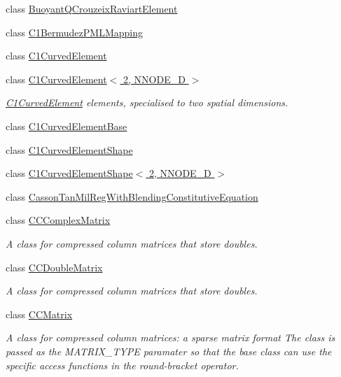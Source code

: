 \begin{DoxyCompactItemize}
class \hyperlink{classoomph_1_1BuoyantQCrouzeixRaviartElement}{Buoyant\+Q\+Crouzeix\+Raviart\+Element}
\item 
class \hyperlink{classoomph_1_1C1BermudezPMLMapping}{C1\+Bermudez\+P\+M\+L\+Mapping}
\item 
class \hyperlink{classoomph_1_1C1CurvedElement}{C1\+Curved\+Element}
\item 
class \hyperlink{classoomph_1_1C1CurvedElement_3_012_00_01NNODE__1D_01_4}{C1\+Curved\+Element$<$ 2, N\+N\+O\+D\+E\+\_\+D $>$}
\begin{DoxyCompactList}\small\item\em \hyperlink{classoomph_1_1C1CurvedElement}{C1\+Curved\+Element} elements, specialised to two spatial dimensions. \end{DoxyCompactList}\item 
class \hyperlink{classoomph_1_1C1CurvedElementBase}{C1\+Curved\+Element\+Base}
\item 
class \hyperlink{classoomph_1_1C1CurvedElementShape}{C1\+Curved\+Element\+Shape}
\item 
class \hyperlink{classoomph_1_1C1CurvedElementShape_3_012_00_01NNODE__1D_01_4}{C1\+Curved\+Element\+Shape$<$ 2, N\+N\+O\+D\+E\+\_\+D $>$}
\item 
class \hyperlink{classoomph_1_1CassonTanMilRegWithBlendingConstitutiveEquation}{Casson\+Tan\+Mil\+Reg\+With\+Blending\+Constitutive\+Equation}
\item 
class \hyperlink{classoomph_1_1CCComplexMatrix}{C\+C\+Complex\+Matrix}
\begin{DoxyCompactList}\small\item\em A class for compressed column matrices that store doubles. \end{DoxyCompactList}\item 
class \hyperlink{classoomph_1_1CCDoubleMatrix}{C\+C\+Double\+Matrix}
\begin{DoxyCompactList}\small\item\em A class for compressed column matrices that store doubles. \end{DoxyCompactList}\item 
class \hyperlink{classoomph_1_1CCMatrix}{C\+C\+Matrix}
\begin{DoxyCompactList}\small\item\em A class for compressed column matrices\+: a sparse matrix format The class is passed as the M\+A\+T\+R\+I\+X\+\_\+\+T\+Y\+PE paramater so that the base class can use the specific access functions in the round-\/bracket operator. \end{DoxyCompactList}\item 

\end{DoxyCompactItemize}
